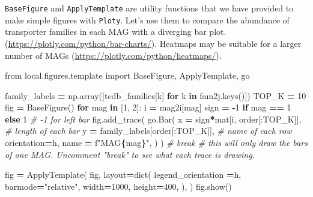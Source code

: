 \documentclass[
]{book}
\newenvironment{Shaded}{\begin{snugshade}}{\end{snugshade}}
\newcommand{\BuiltInTok}[1]{#1}
\newcommand{\CommentTok}[1]{\textcolor[rgb]{0.56,0.35,0.01}{\textit{#1}}}
\newcommand{\ControlFlowTok}[1]{\textcolor[rgb]{0.13,0.29,0.53}{\textbf{#1}}}
\newcommand{\DecValTok}[1]{\textcolor[rgb]{0.00,0.00,0.81}{#1}}
\newcommand{\ImportTok}[1]{#1}
\newcommand{\KeywordTok}[1]{\textcolor[rgb]{0.13,0.29,0.53}{\textbf{#1}}}
\newcommand{\NormalTok}[1]{#1}
\newcommand{\OperatorTok}[1]{\textcolor[rgb]{0.81,0.36,0.00}{\textbf{#1}}}
\newcommand{\SpecialCharTok}[1]{\textcolor[rgb]{0.81,0.36,0.00}{\textbf{#1}}}
\newcommand{\SpecialStringTok}[1]{\textcolor[rgb]{0.31,0.60,0.02}{#1}}
\newcommand{\StringTok}[1]{\textcolor[rgb]{0.31,0.60,0.02}{#1}}
\begin{document}
\texttt{BaseFigure} and \texttt{ApplyTemplate} are utility functions that we have provided to make simple figures with \texttt{Ploty}.
Let's use them to compare the abundance of transporter families in each MAG with a diverging bar plot.
(\url{https://plotly.com/python/bar-charts/}). Heatmaps may be suitable for a larger number of MAGs (\url{https://plotly.com/python/heatmaps/}).

\begin{Shaded}
\begin{Highlighting}[numbers=left,,]
\ImportTok{from}\NormalTok{ local.figures.template }\ImportTok{import}\NormalTok{ BaseFigure, ApplyTemplate, go}

\NormalTok{family\_labels }\OperatorTok{=}\NormalTok{ np.array([tcdb\_families[k] }\ControlFlowTok{for}\NormalTok{ k }\KeywordTok{in}\NormalTok{ fam2j.keys()])}
\NormalTok{TOP\_K }\OperatorTok{=} \DecValTok{10}
\NormalTok{fig }\OperatorTok{=}\NormalTok{ BaseFigure()}
\ControlFlowTok{for}\NormalTok{ mag }\KeywordTok{in}\NormalTok{ [}\DecValTok{1}\NormalTok{, }\DecValTok{2}\NormalTok{]:}
\NormalTok{    i }\OperatorTok{=}\NormalTok{ mag2i[mag]}
\NormalTok{    sign }\OperatorTok{=} \OperatorTok{{-}}\DecValTok{1} \ControlFlowTok{if}\NormalTok{ mag }\OperatorTok{==} \DecValTok{1} \ControlFlowTok{else} \DecValTok{1} \CommentTok{\# {-}1 for left bar}
\NormalTok{    fig.add\_trace(}
\NormalTok{        go.Bar(}
\NormalTok{            x }\OperatorTok{=}\NormalTok{ sign}\OperatorTok{*}\NormalTok{mat[i, order[:TOP\_K]],     }\CommentTok{\# length of each bar}
\NormalTok{            y }\OperatorTok{=}\NormalTok{ family\_labels[order[:TOP\_K]],   }\CommentTok{\# name of each row}
\NormalTok{            orientation}\OperatorTok{=}\StringTok{\textquotesingle{}h\textquotesingle{}}\NormalTok{,}
\NormalTok{            name }\OperatorTok{=} \SpecialStringTok{f"MAG}\SpecialCharTok{\{}\NormalTok{mag}\SpecialCharTok{\}}\SpecialStringTok{"}\NormalTok{,}
\NormalTok{        )}
\NormalTok{    )}
    \CommentTok{\# break \# this will only draw the bars of one MAG. Uncomment "break" to see what each trace is drawing.}

\NormalTok{fig }\OperatorTok{=}\NormalTok{ ApplyTemplate(}
\NormalTok{    fig,}
\NormalTok{    layout}\OperatorTok{=}\BuiltInTok{dict}\NormalTok{(}
\NormalTok{        legend\_orientation }\OperatorTok{=}\StringTok{\textquotesingle{}h\textquotesingle{}}\NormalTok{,}
\NormalTok{        barmode}\OperatorTok{=}\StringTok{"relative"}\NormalTok{,}
\NormalTok{        width}\OperatorTok{=}\DecValTok{1000}\NormalTok{, height}\OperatorTok{=}\DecValTok{400}\NormalTok{,}
\NormalTok{    ),}
\NormalTok{)}
\NormalTok{fig.show()}
\end{Highlighting}
\end{Shaded}
\end{document}
